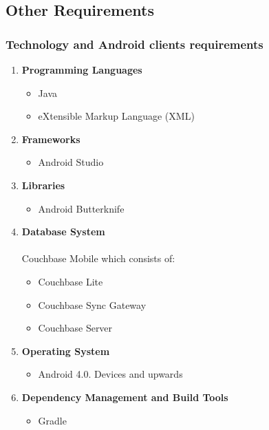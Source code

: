 \documentclass[a4paper,10pt]{article}
\begin{document}
	\subsection{Other Requirements}
	\subsubsection{Technology and Android clients requirements}
\begin{enumerate}
 \item \textbf{Programming Languages}
	\begin{itemize}
		\item Java
		\item eXtensible Markup Language (XML)
	\end{itemize}
\item \textbf{Frameworks}
	\begin{itemize}
		\item Android Studio
	\end{itemize}
\item \textbf{Libraries}
	\begin{itemize}
		\item Android Butterknife
	\end{itemize}
\item \textbf{Database System} \\ \\ 
Couchbase Mobile which consists of:
	\begin{itemize}
 		\item Couchbase Lite
		\item Couchbase Sync Gateway
		\item Couchbase Server
	\end{itemize}
\item \textbf{Operating System}
	\begin{itemize}
 		\item Android 4.0. Devices and upwards
	\end{itemize}
\item \textbf{Dependency Management and Build Tools}
	\begin{itemize}
		\item Gradle
	\end{itemize}
\end{enumerate}
\end{document}
